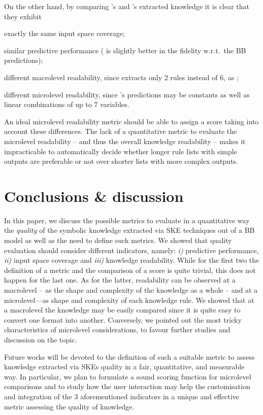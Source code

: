 \documentclass[sigconf]{acmart}
\begin{document}
On the other hand, by comparing \cart{}'s and \creepy{}'s extracted knowledge it is clear that they exhibit
%
\begin{inlinelist}
	\item exactly the same input space coverage;
	\item similar predictive performance (\creepy{} is slightly better in the fidelity w.r.t.\ the BB predictions);
	\item different macrolevel readability, since \creepy{} extracts only 2 rules instead of 6, as \cart{};
	\item different microlevel readability, since \creepy{}'s predictions may be constants as well as linear combinations of up to 7 variables.
\end{inlinelist} 
%
An ideal microlevel readability metric should be able to assign a score taking into account these differences.
%
The lack of a quantitative metric to evaluate the microlevel readability -- and thus the overall knowledge readability -- makes it impracticable to automatically decide whether longer rule lists with simple outputs are preferable or not over shorter lists with more complex outputs.

\section{Conclusions \& discussion}

In this paper, we discuss the possible metrics to evaluate in a quantitative way the \emph{quality} of the symbolic knowledge extracted via SKE techniques out of a BB model as well as the need to define such metrics.
%
We showed that quality evaluation should consider different indicators, namely: \textit{i)} predictive performance, \textit{ii)} input space coverage and \textit{iii)} knowledge readability.
%
While for the first two the definition of a metric and the comparison of a score is quite trivial, this does not happen for the last one.
%
As for the latter, readability can be observed at a macrolevel -- as the shape and complexity of the knowledge as a whole -- and at a microlevel---as shape and complexity of each knowledge rule.
%
We showed that at a macrolevel the knowledge may be easily compared since it is quite easy to convert one format into another.
%
Conversely, we pointed out the most tricky characteristics of microlevel considerations, to favour further studies and discussion on the topic.

Future works will be devoted to the definition of such a suitable metric to assess knowledge extracted via SKEs quality in a fair, quantitative, and measurable way.
%
In particular, we plan to formulate a sound scoring function for microlevel comparisons and to study how the user interaction may help the customisation and integration of the 3 aforementioned indicators in a unique and effective metric assessing the quality of knowledge.
\end{document}
